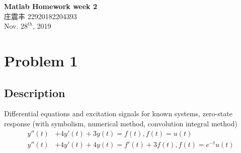 \documentclass[UTF8,a4paper]{article}
\begin{document}
\begin{center}
    \textbf{\LARGE{Matlab Homework week 2}}\\[0.5cm]
    \normalsize{庄震丰 22920182204393}\\[0.5cm]
    \large{Nov. $28^{th}$, 2019}
\end{center}
\section{Problem 1}
\subsection{Description}
Differential equations and excitation signals for known systems, zero-state response (with symbolism, numerical method, convolution integral method)
$$
\begin{aligned}
y''(t)&+4y'(t)+3y(t)=f(t),f(t)=u(t)\\
y''(t)&+4y'(t)+4y(t)=f'(t)+3f(t),f(t)=e^{-t}u(t)
\end{aligned}
$$
\end{document}
